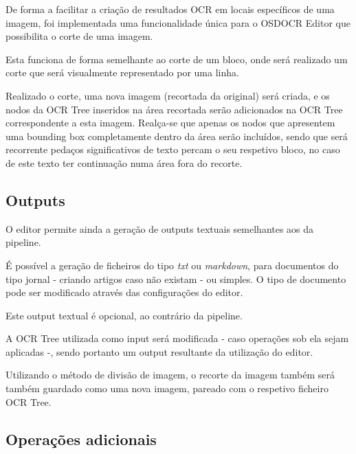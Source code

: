 


De forma a facilitar a criação de resultados OCR em locais específicos de uma imagem, foi implementada uma funcionalidade única para o OSDOCR Editor que possibilita o corte de uma imagem.

Esta funciona de forma semelhante ao corte de um bloco, onde será realizado um corte que será visualmente representado por uma linha.


Realizado o corte, uma nova imagem (recortada da original) será criada, e os nodos da OCR Tree inseridos na área recortada serão adicionados na OCR Tree correspondente a esta imagem. Realça-se que apenas os nodos que apresentem uma bounding box completamente dentro da área serão incluídos, sendo que será recorrente pedaços significativos de texto percam o seu respetivo bloco, no caso de este texto ter continuação numa área fora do recorte.



\subsection{Outputs}

O editor permite ainda a geração de outputs textuais semelhantes aos da pipeline. 

É possível a geração de ficheiros do tipo \textit{txt} ou \textit{markdown}, para documentos do tipo jornal - criando artigos caso não existam - ou simples. O tipo de documento pode ser modificado através das configurações do editor.


Este output textual é opcional, ao contrário da pipeline.

A OCR Tree utilizada como input será modificada - caso operações sob ela sejam aplicadas -, sendo portanto um output resultante da utilização do editor. 

Utilizando o método de divisão de imagem, o recorte da imagem também será também guardado como uma nova imagem, pareado com o respetivo ficheiro OCR Tree.



\subsection{Operações adicionais}

